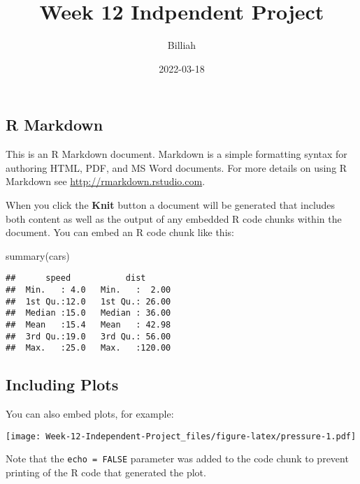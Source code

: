 \documentclass[
]{article}
\title{Week 12 Indpendent Project}
\author{Billiah}
\date{2022-03-18}
\newenvironment{Shaded}{\begin{snugshade}}{\end{snugshade}}
\newcommand{\FunctionTok}[1]{\textcolor[rgb]{0.00,0.00,0.00}{#1}}
\newcommand{\NormalTok}[1]{#1}
\begin{document}
\maketitle

\hypertarget{r-markdown}{%
\subsection{R Markdown}\label{r-markdown}}

This is an R Markdown document. Markdown is a simple formatting syntax
for authoring HTML, PDF, and MS Word documents. For more details on
using R Markdown see \url{http://rmarkdown.rstudio.com}.

When you click the \textbf{Knit} button a document will be generated
that includes both content as well as the output of any embedded R code
chunks within the document. You can embed an R code chunk like this:

\begin{Shaded}
\begin{Highlighting}[]
\FunctionTok{summary}\NormalTok{(cars)}
\end{Highlighting}
\end{Shaded}

\begin{verbatim}
##      speed           dist       
##  Min.   : 4.0   Min.   :  2.00  
##  1st Qu.:12.0   1st Qu.: 26.00  
##  Median :15.0   Median : 36.00  
##  Mean   :15.4   Mean   : 42.98  
##  3rd Qu.:19.0   3rd Qu.: 56.00  
##  Max.   :25.0   Max.   :120.00
\end{verbatim}

\hypertarget{including-plots}{%
\subsection{Including Plots}\label{including-plots}}

You can also embed plots, for example:

\texttt{[image: Week-12-Independent-Project\_files/figure-latex/pressure-1.pdf]}

Note that the \texttt{echo\ =\ FALSE} parameter was added to the code
chunk to prevent printing of the R code that generated the plot.
\end{document}
